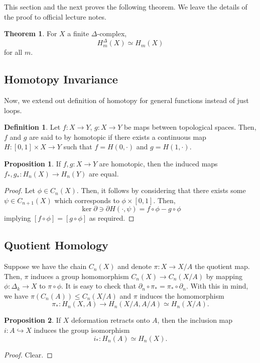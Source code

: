 \documentclass[]{article}
\theoremstyle{definition}
\newtheorem{theorem}{Theorem}
\theoremstyle{definition}
\newtheorem{definition}{Definition}[section]
\newtheorem{proposition}{Proposition}[section]
\begin{document}
This section and the next proves the following theorem. We leave the details 
of the proof to official lecture notes.

\begin{theorem}
  For \(X\) a finite \(\Delta\)-complex, 
  \[H_m^\Delta(X) \simeq H_m(X)\]
  for all \(m\).
\end{theorem}

\subsection{Homotopy Invariance}

Now, we extend out definition of homotopy for general functions instead of 
just loops.

\begin{definition}
  Let \(f : X \to Y\), \(g : X \to Y\) be maps between topological spaces. 
  Then, \(f\) and \(g\) are said to by homotopic if there exists a continuous 
  map \(H : [0, 1] \times X \to Y\) such that \(f = H(0, \cdot)\) and 
  \(g = H(1, \cdot)\).
\end{definition}

\begin{proposition}
  If \(f, g : X \to Y\) are homotopic, then the induced maps 
  \(f_*, g_* : H_n(X) \to H_n(Y)\) are equal. 
\end{proposition}
\begin{proof}
  Let \(\phi \in C_n(X)\). Then, it follows by considering that there exists some 
  \(\psi \in C_{n + 1}(X)\) which corresponds to \(\phi \times [0, 1]\). Then, 
  \[\ker \partial \ni \partial H(\cdot, \psi) = f \circ \phi - g \circ \phi\]
  implying \([f \circ \phi] = [g \circ \phi]\) as required.
\end{proof}

\subsection{Quotient Homology}

Suppose we have the chain \(C_n(X)\) and denote \(\pi : X \to X / A\) the 
quotient map. Then, \(\pi\) induces a group homomorphism 
\(C_n(X) \to C_n(X / A)\) by mapping \(\phi : \Delta_k \to X\) to 
\(\pi \circ \phi\). It is easy to check that 
\(\partial_n \circ \pi_* = \pi_* \circ \partial_n\). With this in mind, 
we have \(\pi(C_n(A)) \le C_n(X / A)\) and \(\pi\) induces the homomorphism 
\[\pi_* : H_n(X, A) \to H_n(X / A, A / A) \simeq H_n(X / A).\]

\begin{proposition}
  If \(X\) deformation retracts onto \(A\), then the inclusion map 
  \(i : A \hookrightarrow X\) induces the group isomorphism
  \[i_* : H_n(A) \simeq H_n(X).\]
\end{proposition}
\begin{proof}
  Clear.
\end{proof}
\end{document}
